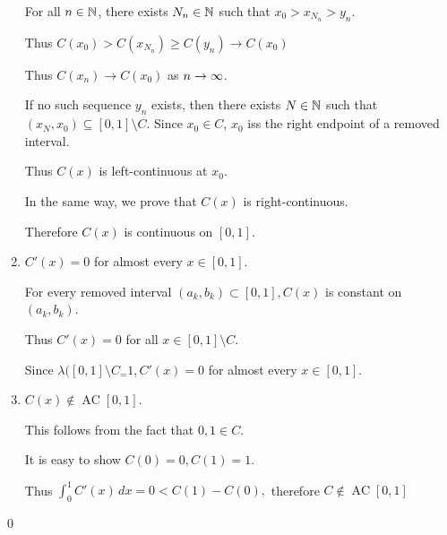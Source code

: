 \documentclass[x11names,reqno,14pt]{extarticle}
\DeclareMathOperator{\AC}{AC}
\begin{document}
\begin{enumerate}
For all $n \in \mathbb{N}$, there exists $N_n\in\mathbb{N}$ such that $x_0 > x_{N_n} > y_n$. 

Thus $C(x_0) > C(x_{N_n}) \geq C(y_n) \to C(x_0)$

Thus $C(x_n)\to C(x_0)$ as $n\to\infty$.

If no such sequence $y_n$ exists, then there exists $N \in \mathbb{N}$ such that $(x_N, x_0) \subseteq [0,1]\setminus C$. Since $x_0 \in C$, $x_0$ iss the right endpoint of a removed interval. 

Thus $C(x)$ is left-continuous at $x_0$. 

In the same way, we prove that $C(x)$ is right-continuous. 

Therefore $C(x)$ is continuous on $[0, 1]$. 

\item $C'(x) = 0$ for almost every $x \in [0, 1]$. 

For every removed interval $(a_k, b_k) \subset [0, 1], C(x)$ is constant on $(a_k, b_k)$. 

Thus $C'(x) = 0$ for all $x \in [0, 1]\setminus C$. 

Since $\lambda([0,1]\setminus C_ = 1, C'(x) = 0$ for almost every $x \in [0, 1]$. 

\item $C(x)\not\in\AC[0,1]$. 

This follows from the fact that $0, 1 \in C$. 

It is easy to show $C(0) = 0, C(1) = 1$. 

Thus $\int_0^1C'(x)\,dx = 0 < C(1) - C(0),$ therefore $C\not\in\AC[0,1]$

\end{enumerate}

\qed
\end{document}
